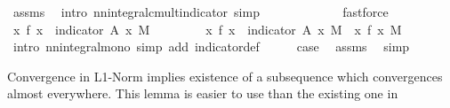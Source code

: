 \begin{isabellebody}
\ assms{\isacharparenleft}{\kern0pt}{}{\isacharparenright}{\kern0pt}\ \isamarkupfalse%
\ {\isacharparenleft}{\kern0pt}intro\ nn{\isacharunderscore}{\kern0pt}integral{\isacharunderscore}{\kern0pt}cmult{\isacharunderscore}{\kern0pt}indicator{\isacharcomma}{\kern0pt}\ simp{\isacharparenright}{\kern0pt}\isanewline
\ \ \isamarkupfalse%
\ \isamarkupfalse%
\ {\isachardoublequoteopen}{\isachardot}{\kern0pt}{\isachardot}{\kern0pt}{\isachardot}{\kern0pt}\ {\isacharequal}{\kern0pt}\ {\isasyminfinity}{\isachardoublequoteclose}\ \isamarkupfalse%
\ {\isacharasterisk}{\kern0pt}\ \isamarkupfalse%
\ fastforce\isanewline
\ \ \isamarkupfalse%
\ \isamarkupfalse%
\ {\isachardoublequoteopen}{\isacharparenleft}{\kern0pt}{\isasymintegral}\isactrlsup {\isacharplus}{\kern0pt}x{\isachardot}{\kern0pt}\ f\ x\ {\isacharasterisk}{\kern0pt}\ indicator\ {\isacharquery}{\kern0pt}A\ x\ {\isasympartial}M{\isacharparenright}{\kern0pt}\ {\isacharequal}{\kern0pt}\ {\isasyminfinity}{\isachardoublequoteclose}\ \isacommand{{\isachardot}{\kern0pt}}\isamarkupfalse%
\isanewline
\ \ \isamarkupfalse%
\ \isamarkupfalse%
\ {\isachardoublequoteopen}{\isacharparenleft}{\kern0pt}{\isasymintegral}\isactrlsup {\isacharplus}{\kern0pt}x{\isachardot}{\kern0pt}\ f\ x\ {\isacharasterisk}{\kern0pt}\ indicator\ {\isacharquery}{\kern0pt}A\ x\ {\isasympartial}M{\isacharparenright}{\kern0pt}\ {\isasymle}\ {\isacharparenleft}{\kern0pt}{\isasymintegral}\isactrlsup {\isacharplus}{\kern0pt}x{\isachardot}{\kern0pt}\ f\ x\ {\isasympartial}M{\isacharparenright}{\kern0pt}{\isachardoublequoteclose}\ \isamarkupfalse%
\ {\isacharparenleft}{\kern0pt}intro\ nn{\isacharunderscore}{\kern0pt}integral{\isacharunderscore}{\kern0pt}mono{\isacharcomma}{\kern0pt}\ simp\ add{\isacharcolon}{\kern0pt}\ indicator{\isacharunderscore}{\kern0pt}def{\isacharparenright}{\kern0pt}\isanewline
\ \ \isamarkupfalse%
\ \isamarkupfalse%
\ {\isacharquery}{\kern0pt}case\ \isamarkupfalse%
\ assms{\isacharparenleft}{\kern0pt}{}{\isacharparenright}{\kern0pt}\ \isamarkupfalse%
\ simp\isanewline
{}\isamarkupfalse%
%
\endisatagproof
{\isafoldproof}%
%
\isadelimproof
%
\endisadelimproof
%
\begin{isamarkuptext}%
Convergence in L1-Norm implies existence of a subsequence which convergences almost everywhere. 
      This lemma is easier to use than the existing one in %

\end{isamarkuptext}
\end{isabellebody}
